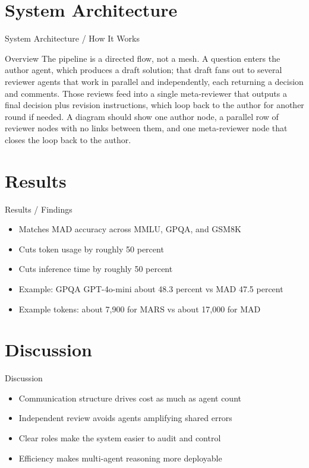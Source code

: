 \documentclass[10pt]{beamer}
\begin{document}
\section{System Architecture}
\begin{frame}{System Architecture / How It Works}
  \begin{block}{Overview}
  The pipeline is a directed flow, not a mesh. A question enters the author agent, which produces a draft solution; that draft fans out to several reviewer agents that work in parallel and independently, each returning a decision and comments. Those reviews feed into a single meta-reviewer that outputs a final decision plus revision instructions, which loop back to the author for another round if needed. A diagram should show one author node, a parallel row of reviewer nodes with no links between them, and one meta-reviewer node that closes the loop back to the author.
  \end{block}
\end{frame}

\section{Results}
\begin{frame}[allowframebreaks]{Results / Findings}
\begin{itemize}
  \item Matches MAD accuracy across MMLU, GPQA, and GSM8K
  \item Cuts token usage by roughly 50 percent
  \item Cuts inference time by roughly 50 percent
  \item Example: GPQA GPT-4o-mini about 48.3 percent vs MAD 47.5 percent
  \item Example tokens: about 7,900 for MARS vs about 17,000 for MAD
\end{itemize}
\end{frame}

\section{Discussion}
\begin{frame}{Discussion}
\begin{itemize}
  \item Communication structure drives cost as much as agent count
  \item Independent review avoids agents amplifying shared errors
  \item Clear roles make the system easier to audit and control
  \item Efficiency makes multi-agent reasoning more deployable
\end{itemize}
\end{frame}
\end{document}

